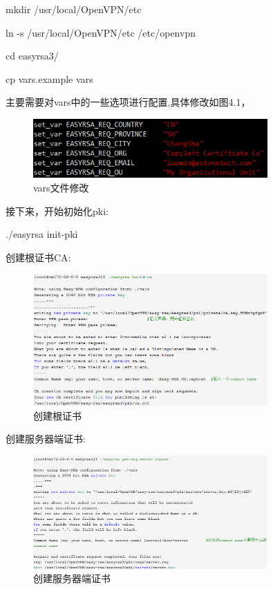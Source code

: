 \documentclass[a4paper,12pt]{report}
\begin{document}
\begin{spacing}{1.5}
\begin{tcolorbox}[notitle,boxrule=0pt,colback=gray!20,colframe=gray!20]
mkdir /usr/local/OpenVPN/etc

ln -s /usr/local/OpenVPN/etc /etc/openvpn

cd easyrsa3/

cp vars.example vars
\end{tcolorbox}
主要需要对vars中的一些选项进行配置,具体修改如图4.1，
\begin{figure}[hbtp]
	\centering
	\includegraphics [width=0.8\textwidth]{figure//vars_01.png}
	\caption{vars文件修改}\label{vars_01}
\end{figure}

接下来，开始初始化pki:
\begin{tcolorbox}[notitle,boxrule=0pt,colback=gray!20,colframe=gray!20]
./easyrsa init-pki
\end{tcolorbox}

创建根证书CA:
\begin{figure}[hbtp]
	\centering
	\includegraphics [width=0.8\textwidth]{figure//build-ca.png}
	\caption{创建根证书}\label{build-ca}
\end{figure}

创建服务器端证书:
\begin{figure}[hbtp]
	\centering
	\includegraphics [width=0.8\textwidth]{figure//server-ca.png}
	\caption{创建服务器端证书}\label{server-ca}
\end{figure}



\end{spacing}
\end{document}
